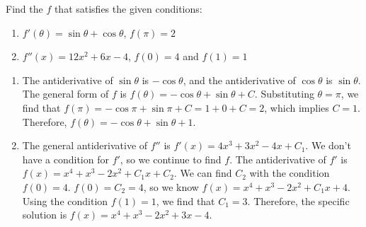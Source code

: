 \begin{Exercise}[label=antideriv4]
	Find the $f$ that satisfies the given conditions:
	\begin{enumerate}
	\item $f'(\theta) = \sin{\theta} + \cos{\theta}$, $f(\pi) = 2$
	\item $f''(x) = 12x^2 + 6x - 4$, $f(0) = 4$ and $f(1) = 1$
	\end{enumerate}
\end{Exercise}
	
\begin{Answer}[ref=antideriv4]
	\begin{enumerate}
	\item The antiderivative of $\sin{\theta}$ is $-\cos{\theta}$, and the 
	antiderivative of $\cos{\theta}$ is $\sin{\theta}$. The general form 
	of $f$ is $f(\theta) = -\cos{\theta} + \sin{\theta} + C$. 
	Substituting $\theta = \pi$, we find that $f(\pi) = -\cos{\pi} + 
	\sin{\pi} + C = 1 + 0 + C = 2$, which implies $C = 1$. Therefore, 
	$f(\theta) = -\cos{\theta} + \sin{\theta} + 1$.
	\item The general antiderivative of $f''$ is $f'(x) = 4x^3 + 3x^2 - 
	4x + C_1$. We don't have a condition for $f'$, so we continue to find 
	$f$. The antiderivative of $f'$ is $f(x) = x^4 + x^3 - 2x^2 + C_1x + 
	C_2$. We can find $C_2$ with the condition $f(0) = 4$. $f(0) = C_2 
	= 4$, so we know $f(x) = x^4 + x^3 - 2x^2 + C_1x + 4$. Using the 
	condition $f(1) = 1$, we find that $C_1 = 3$. Therefore, the specific 
	solution is $f(x) = x^4 + x^3 - 2x^2 + 3x - 4$. 
	\end{enumerate}
	 
\end{Answer}



